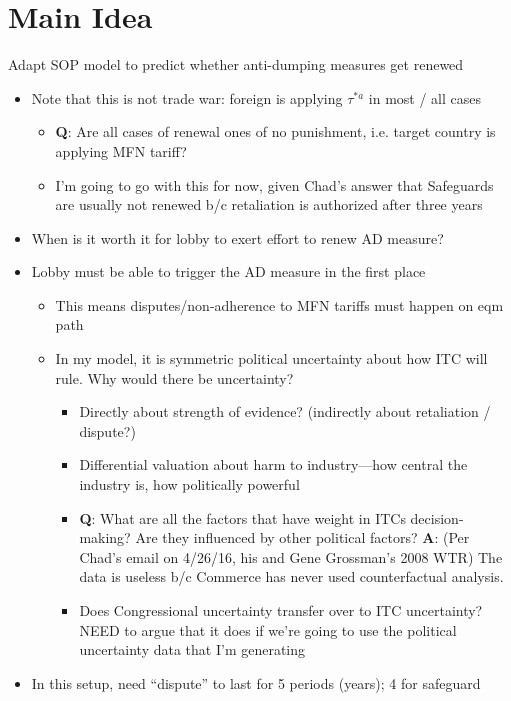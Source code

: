 \documentclass[12pt]{article}
\begin{document}
\section{Main Idea}
Adapt SOP model to predict whether anti-dumping measures get renewed
\begin{itemize}
	\item Note that this is not trade war: foreign is applying $\tau^{*a}$ in most / all cases
		\begin{itemize}
			\item \textbf{Q}: Are all cases of renewal ones of no punishment, i.e. target country is applying MFN tariff?
			\item I'm going to go with this for now, given Chad's answer that Safeguards are usually not renewed b/c retaliation is authorized after three years
		\end{itemize}
	\item When is it worth it for lobby to exert effort to renew AD measure?
	\item Lobby must be able to trigger the AD measure in the first place
		\begin{itemize}
			\item This means disputes/non-adherence to MFN tariffs must happen on eqm path
			\item In my model, it is symmetric political uncertainty about how ITC will rule. Why would there be uncertainty?
				\begin{itemize}
					\item Directly about strength of evidence? (indirectly about retaliation / dispute?)
					\item Differential valuation about harm to industry---how central the industry is, how politically powerful
					\item \textbf{Q}: What are all the factors that have weight in ITCs decision-making? Are they influenced by other political factors? 
					\textbf{A}: (Per Chad's email on 4/26/16, his and Gene Grossman's 2008 WTR) The data is useless b/c Commerce has never used counterfactual analysis.
					\item Does Congressional uncertainty transfer over to ITC uncertainty? NEED to argue that it does if we're going to use the political uncertainty data that I'm generating
				\end{itemize}
		\end{itemize}
	\item In this setup, need ``dispute'' to last for 5 periods (years); 4 for safeguard
		\begin{itemize}

\end{itemize}
\end{itemize}
\end{document}
